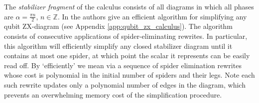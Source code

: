 The \emph{stabilizer fragment} of the calculus consists of all diagrams in which all phases are $\alpha=\frac{\pi n}{2}$, $n\in\mathbb{Z}$.
In \cite[Theorem 5.4]{graph_theoretic_simplification} the authors give an efficient algorithm for simplifying any qubit ZX-diagram (see Appendix \ref{app:qubit_zx_calculus}).
The algorithm consists of consecutive applications of
spider-eliminating rewrites.
In particular,
this algorithm will efficiently simplify any closed stabilizer diagram until it contains at most one spider, at which point the scalar it represents can be easily read off. 
By `efficiently' we mean via a sequence of spider elimination rewrites whose cost is polynomial in the initial number of spiders and their legs. Note each such rewrite updates only a polynomial number of edges in the diagram, which prevents an overwhelming memory cost of the simplification procedure.